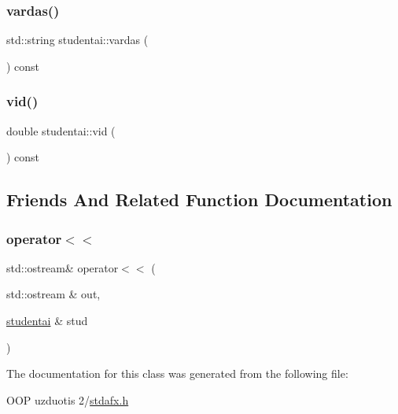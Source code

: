\subsubsection{\texorpdfstring{vardas()}{vardas()}}
{\footnotesize\ttfamily std\+::string studentai\+::vardas (\begin{DoxyParamCaption}{ }\end{DoxyParamCaption}) const\hspace{0.3cm}{\ttfamily [inline]}}

\mbox{\label{classstudentai_ab58ca300910c5cb8acd808e30bf8779c}} 
\subsubsection{\texorpdfstring{vid()}{vid()}}
{\footnotesize\ttfamily double studentai\+::vid (\begin{DoxyParamCaption}{ }\end{DoxyParamCaption}) const\hspace{0.3cm}{\ttfamily [inline]}}



\subsection{Friends And Related Function Documentation}
\mbox{\label{classstudentai_ae5b471d7fdfc5bfd7d76bb9aff82093a}} 
\subsubsection{\texorpdfstring{operator$<$$<$}{operator<<}}
{\footnotesize\ttfamily std\+::ostream\& operator$<$$<$ (\begin{DoxyParamCaption}\item[{std\+::ostream \&}]{out,  }\item[{\mbox{\hyperlink{classstudentai}{studentai}} \&}]{stud }\end{DoxyParamCaption})\hspace{0.3cm}{\ttfamily [friend]}}



The documentation for this class was generated from the following file\+:\begin{DoxyCompactItemize}
\item 
O\+O\+P uzduotis 2/\mbox{\hyperlink{stdafx_8h}{stdafx.\+h}}\end{DoxyCompactItemize}
